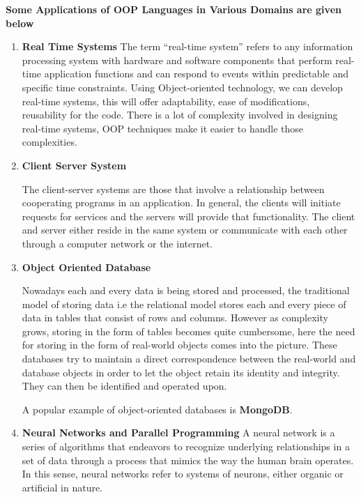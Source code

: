 \documentclass[11pt]{article}
\begin{document}
\textbf{Some Applications of OOP Languages in Various Domains are given below}\\

\begin{enumerate}
	\item \textbf{Real Time Systems }
	The term “real-time system” refers to any information processing system with hardware and software components that perform real-time application functions and can respond to events within predictable and specific time constraints. Using Object-oriented technology, we can develop real-time systems, this will offer adaptability, ease of modifications, reusability for the code. There is a lot of complexity involved in designing real-time systems, OOP techniques make it easier to handle those complexities.
	
	\item \textbf{Client Server System }
	
	The client-server systems are those that involve a relationship between cooperating programs in an application. In general, the clients will initiate requests for services and the servers will provide that functionality. The client and server either reside in the same system or communicate with each other through a computer network or the internet.

	
	\item \textbf{Object Oriented Database }
	
	Nowadays each and every data is being stored and processed, the traditional model of storing data i.e the relational model stores each and every piece of data in tables that consist of rows and columns. However as complexity grows, storing in the form of tables becomes quite cumbersome, here the need for storing in the form of real-world objects comes into the picture. These databases try to maintain a direct correspondence between the real-world and database objects in order to let the object retain its identity and integrity. They can then be identified and operated upon.
	
	A popular example of object-oriented databases is \textbf{MongoDB}.
	
	\item \textbf{Neural Networks and Parallel Programming }
	A neural network is a series of algorithms that endeavors to recognize underlying relationships in a set of data through a process that mimics the way the human brain operates. In this sense, neural networks refer to systems of neurons, either organic or artificial in nature.
	

\end{enumerate}
\end{document}
